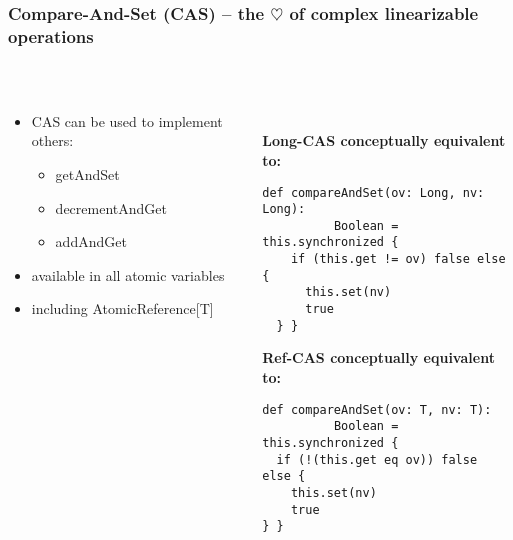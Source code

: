 \documentclass[aspectratio=169]{beamer}
\begin{document}
\begin{frame}[fragile]\frametitle{Compare-And-Set (CAS) -- the \alert{$\heartsuit$} of complex linearizable operations}
~\\[-8mm]
\begin{columns}
\begin{column}{0.48\textwidth}
\begin{itemize}
  \item CAS can be used to implement others:
    \begin{itemize}
      \item getAndSet
      \item decrementAndGet
      \item addAndGet
    \end{itemize}
  \item available in all atomic variables
  \item including AtomicReference[T]
\end{itemize}
\end{column}
\begin{column}{0.54\textwidth}
~\\
\textbf{Long-CAS conceptually equivalent to:}
\begin{lstlisting}[emph={execute,sleep,log,Long,synchronized}]
def compareAndSet(ov: Long, nv: Long):
          Boolean = this.synchronized {
    if (this.get != ov) false else {
      this.set(nv)
      true
  } }
\end{lstlisting}
\textbf{Ref-CAS conceptually equivalent to:}
\begin{lstlisting}[emph={execute,sleep,log,T,synchronized}]
def compareAndSet(ov: T, nv: T):
          Boolean = this.synchronized {
  if (!(this.get eq ov)) false else {
    this.set(nv)
    true
} }
\end{lstlisting}
\end{column}
\end{columns}
\end{frame}
\end{document}
